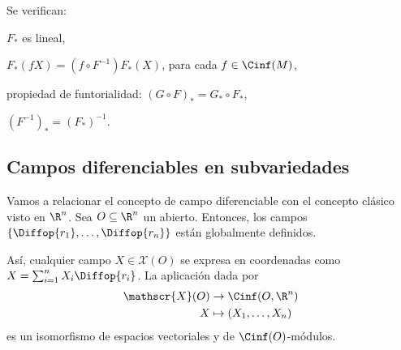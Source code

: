\begin{nprop}[Propiedades de $F_{*}$]
  Se verifican:
  \begin{nlist}
  \item
    $F_{*}$ es lineal,
  \item
    $F_{*}(fX) = (f\circ F^{-1})F_{*}(X)$, para cada $f\in\Cinf(M)$,
  \item
    propiedad de funtorialidad: $(G\circ F)_{*} = G_{*}\circ F_{*}$,
  \item
    $(F^{-1})_{*} = (F_{*})^{-1}$.
  \end{nlist}
\end{nprop}

\subsection{Campos diferenciables en subvariedades}

Vamos a relacionar el concepto de campo diferenciable con el concepto clásico
visto en $\R^{n}$. Sea $O\subseteq \R^{n}$ un abierto. Entonces, los campos
$\left\{ \Diffop{r_{1}},\dots, \Diffop{r_{n}} \right\}$ están globalmente
definidos.

Así, cualquier campo $X\in \mathscr{X}(O)$ se expresa en coordenadas como $X =
\sum_{i=1}^{n} X_{i}\Diffop{r_{i}}$. La aplicación dada por
\begin{alignat*}{2}
   \mathscr{X}(O) & \to \Cinf(O,\R^{n}) \\
  X & \mapsto (X_{1}, \dots, X_{n}) 
\end{alignat*}
es un isomorfismo de espacios vectoriales y de $\Cinf(O)$-módulos.

